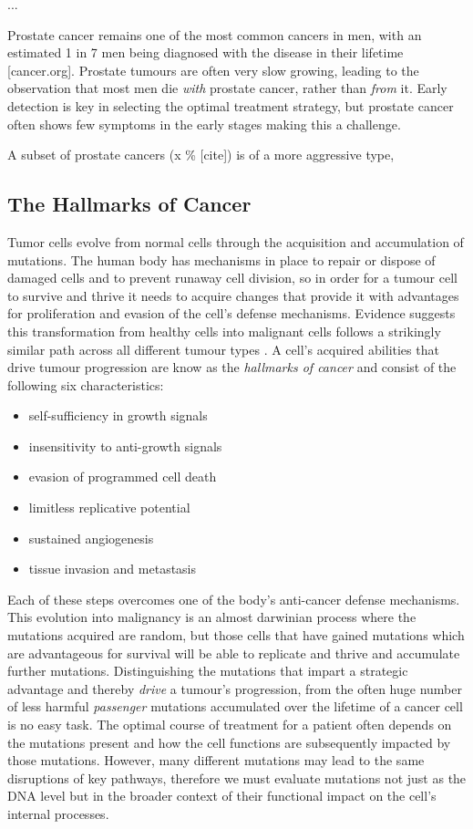 ...

Prostate cancer remains one of the most common cancers in men, with an estimated 1 in 7 men being diagnosed with the disease in their lifetime \cite{}[cancer.org]. Prostate tumours are often very slow growing, leading to the observation that most men die \emph{with} prostate cancer, rather than \emph{from} it. Early detection is key in selecting the optimal treatment strategy, but prostate cancer often shows few symptoms in the early stages making this a challenge.

A subset of prostate cancers (x \% [cite]) is of a more aggressive type,


\subsection{The Hallmarks of Cancer}

Tumor cells evolve from normal cells through the acquisition and accumulation of mutations. The human body has mechanisms in place to repair or dispose of damaged cells and to prevent runaway cell division, so in order for a tumour cell to survive and thrive it needs to acquire changes that provide it with advantages for proliferation and evasion of the cell's defense mechanisms. Evidence suggests this transformation from healthy cells into malignant cells follows a strikingly similar path across all different tumour types \cite{}. A cell's acquired abilities that drive tumour progression are know as the \emph{hallmarks of cancer} and consist of the following six characteristics:

\begin{itemize}
    \item self-sufficiency in growth signals
    \item insensitivity to anti-growth signals
    \item evasion of programmed cell death
    \item limitless replicative potential
    \item sustained angiogenesis
    \item tissue invasion and metastasis
\end{itemize}

Each of these steps overcomes one of the body's anti-cancer defense mechanisms. This evolution into malignancy is an almost darwinian process where the mutations acquired are random, but those cells that have gained mutations which are advantageous for survival will be able to replicate and thrive and accumulate further mutations. Distinguishing the mutations that impart a strategic advantage and thereby \emph{drive} a tumour's progression, from the often huge number of less harmful \emph{passenger} mutations accumulated over the lifetime of a cancer cell is no easy task. The optimal course of treatment for a patient often depends on the mutations present and how the cell functions are subsequently impacted by those mutations. However, many different mutations may lead to the same disruptions of key pathways, therefore we must evaluate mutations not just as the DNA level but in the broader context of their functional impact on the cell's internal processes.


